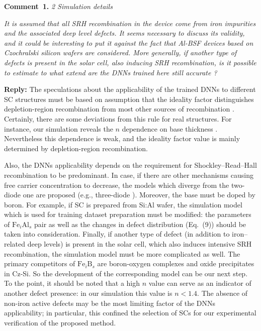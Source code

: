 \documentclass[num-refs]{wiley-article} %
\begin{document}
\textcolor[rgb]{0.00,0.50,1.00}{\textbf{Comment~1.}}
\emph{2 Simulation details}

\emph{It is assumed that all SRH recombination in the device come from iron impurities and the associated deep level defects.
It seems necessary to discuss its validity, and it could be interesting to put it against the fact that Al-BSF devices based on Czochralski silicon wafers are considered.
More generally, if another type of defects is present in the solar cell, also inducing SRH recombination,
is it possible to estimate to what extend are the DNNs trained here still accurate ? }

\vspace{0.5cm}
\noindent
\textcolor[rgb]{0.51,0.00,0.00}{\textbf{Reply:}}
The speculations about the applicability of the trained DNNs to different SC structures
must be based on assumption that the ideality factor distinguishes
depletion-region recombination from most other sources of recombination \cite{Breitenstein2013,n2McIntosh}.
Certainly, there are some deviations from this rule for real structures.
For instance, our simulation reveals the $n$ dependence on base thickness \cite{OlikhJPS}.
Nevertheless this dependence is weak, and the ideality factor value is mainly determined
by depletion-region recombination.



Also, the DNNs applicability depends on the requirement for Shockley–Read–Hall recombination to be predominant.
In case,
if there are other mechanisms causing free carrier concentration to decrease,
the models which diverge from the two-diode one are proposed
(e.g., three-diode \cite{TreeDiode,Shah}).
Moreover, the base must be doped by boron.
For example, if SC is prepared from Si:Al wafer,
the simulation model which is used for training dataset preparation must be modified:
the parameters of $\mathrm{Fe}_i\mathrm{Al}_s$ pair as well as
the changes in defect distribution (Eq.~(9)) should be taken into consideration.
Finally, if another type of defect (in addition to iron--related deep levels)
is present in the solar cell, which also induces intensive SRH recombination,
the simulation model must be more complicated as well.
The primary competitors of $\mathrm{Fe}_i\mathrm{B}_s$  are  boron-oxygen complexes \cite{LIDRev,LIDRev2}
and oxide precipitates \cite{MurphySC2014,Oxide:Chen} in Cz-Si.
So the development of the corresponding model can be our next step.
To the point, it should be noted that a high $n$ value can serve as an indicator of another defect presence:
in our simulation this value is $n<1.4$.
The absence of non-iron active defects may be the most limiting factor of the DNNs applicability;
in particular, this confined the selection of SCs for our experimental verification of the proposed method.
\end{document}
